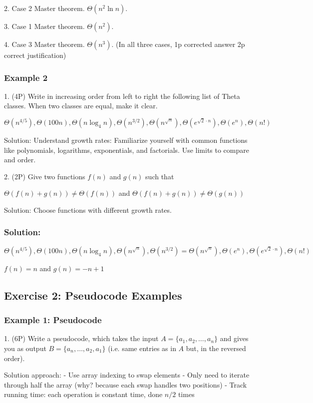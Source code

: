 2. Case 2 Master theorem. $\Theta(n^2 \ln n)$.

3. Case 1 Master theorem. $\Theta(n^2)$.

4. Case 3 Master theorem. $\Theta(n^3)$. (In all three cases, 1p corrected answer 2p correct justification)

\subsubsection{Example 2}
1. (4P) Write in increasing order from left to right the following list of Theta classes. When two classes are equal, make it clear.

$\Theta(n^{4/5}), \Theta(100n), \Theta(n \log_4 n), \Theta(n^{3/2}), \Theta(n^{\sqrt{n}}), \Theta(e^{\sqrt{2} \cdot n}), \Theta(e^n), \Theta(n!)$

Solution: Understand growth rates: Familiarize yourself with common functions like polynomials, logarithms, exponentials, and factorials. Use limits to compare and order.

2. (2P) Give two functions $f(n)$ and $g(n)$ such that

$\Theta(f(n) + g(n)) \neq \Theta(f(n))$ and $\Theta(f(n) + g(n)) \neq \Theta(g(n))$

Solution: Choose functions with different growth rates.

\subsubsection{Solution:}
$\Theta(n^{4/5}), \Theta(100n), \Theta(n \log_4 n), \Theta(n^{\sqrt{n}}), \Theta(n^{3/2}) = \Theta(n^{\sqrt{n}}), \Theta(e^n), \Theta(e^{\sqrt{2} \cdot n}), \Theta(n!)$

$f(n) = n$ and $g(n) = -n + 1$

\subsection{Exercise 2: Pseudocode Examples}

\subsubsection{Example 1: Pseudocode}

1. (6P) Write a pseudocode, which takes the input $A = \{a_1,a_2,\ldots,a_n\}$ and gives you as output $B = \{a_n,\ldots,a_2,a_1\}$ (i.e. same entries as in $A$ but, in the reversed order).

Solution approach:
- Use array indexing to swap elements
- Only need to iterate through half the array (why? because each swap handles two positions)
- Track running time: each operation is constant time, done $n/2$ times

